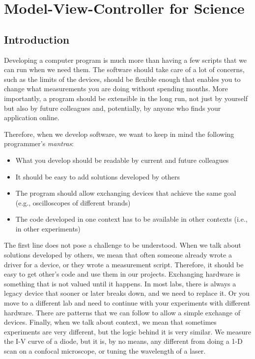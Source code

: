 \chapter{Model-View-Controller for Science}\label{ch:mvcs}

\section{Introduction}\label{sec:mvc-introduction}
Developing a computer program is much more than having a few scripts that we can run when we need them. The software should take care of a lot of concerns, such as the limits of the devices, should be flexible enough that enables you to change what measurements you are doing without spending months. More importantly, a program should be extensible in the long run, not just by yourself but also by future colleagues and, potentially, by anyone who finds your application online.

Therefore, when we develop software, we want to keep in mind the following programmer's \emph{mantras}:

\begin{itemize}
\item What you develop should be readable by current and future colleagues
\item It should be easy to add solutions developed by others
\item The program should allow exchanging devices that achieve the same goal (e.g., oscilloscopes of different brands)
\item The code developed in one context has to be available in other contexts (i.e., in other experiments)
\end{itemize}

The first line does not pose a challenge to be understood. When we talk about solutions developed by others, we mean that often someone already wrote a driver for a device, or they wrote a measurement script. Therefore, it should be easy to get other's code and use them in our projects. Exchanging hardware is something that is not valued until it happens. In most labs, there is always a legacy device that sooner or later breaks down, and we need to replace it. Or you move to a different lab and need to continue with your experiments with different hardware. There are patterns that we can follow to allow a simple exchange of devices. Finally, when we talk about context, we mean that sometimes experiments are very different, but the logic behind it is very similar. We measure the I-V curve of a diode, but it is, by no means, any different from doing a 1-D scan on a confocal microscope, or tuning the wavelength of a laser.


